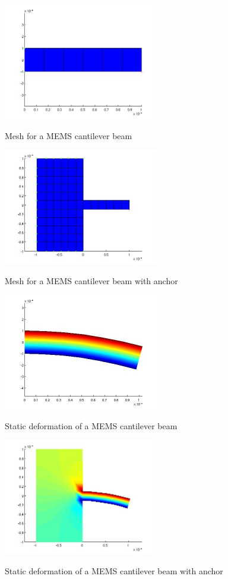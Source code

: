 \begin{figure}[htbp]
\begin{minipage}{0.45\linewidth}
\includegraphics[height = 2in]{fig/mems_cant_m_mesh.jpg}
\caption{Mesh for a MEMS cantilever beam}
\label{fig:MEMSCantileverBeamTEMesh}
\includegraphics[height = 2in]{fig/mems_cant_wa_m_mesh.jpg}
\caption{Mesh for a MEMS cantilever beam with anchor}
\label{fig:MEMSCantileverBeamWaTEMesh}
\end{minipage}
\hfill
\begin{minipage}{0.45\linewidth}
\includegraphics[height = 2in]{fig/mems_cant_te_sta.jpg}
\caption{Static deformation of a MEMS cantilever beam}
\label{fig:MEMSCantileverBeamTEStatic}
\includegraphics[height = 2in]{fig/mems_cant_wa_te_sta.jpg}
\caption{Static deformation of a MEMS cantilever beam with anchor}
\label{fig:MEMSCantileverBeamWaTEStatic}
\end{minipage}
\end{figure}

